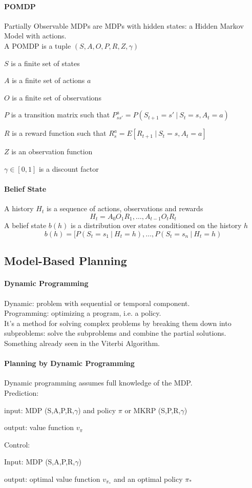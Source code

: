 \documentclass[10pt]{report}
\begin{document}
\paragraph{POMDP} Partially Observable MDPs are MDPs with hidden states: a Hidden Markov Model with actions.\\
A POMDP is a tuple $(S,A,O,P,R,Z,\gamma)$
\begin{list}{}{}
	\item $S$ is a finite set of states
	\item $A$ is a finite set of actions $a$
	\item $O$ is a finite set of observations
	\item $P$ is a transition matrix such that $P_{ss'}^a=P(S_{t+1}=s'\:|\:S_t=s,A_t=a)$
	\item $R$ is a reward function such that $R_s^a = E[R_{t+1}\:|\:S_t=s,A_t=a]$
	\item $Z$ is an observation function
	\item $\gamma\in[0,1]$ is a discount factor
\end{list}
\paragraph{Belief State} A history $H_t$ is a sequence of actions, observations and rewards $$H_t = A_0O_1R_1,\ldots,A_{t-1}O_tR_t$$
A belief state $b(h)$ is a distribution over states conditioned on the history $h$
$$b(h) = [P(S_t=s_1\:|\:H_t=h),\ldots,P(S_t=s_n\:|\:H_t=h)$$
\subsection{Model-Based Planning}
\paragraph{Dynamic Programming} Dynamic: problem with sequential or temporal component.\\
Programming: optimizing a program, i.e. a policy.\\
It's a method for solving complex problems by breaking them down into subproblems: solve the subproblems and combine the partial solutions.\\
Something already seen in the Viterbi Algorithm.
\paragraph{Planning by Dynamic Programming} Dynamic programming assumes full knowledge of the MDP.\\
Prediction:\begin{list}{}{}
	\item input: MDP (S,A,P,R,$\gamma$) and policy $\pi$ or MKRP (S,P,R,$\gamma$)
	\item output: value function $v_\pi$
\end{list}
Control:
\begin{list}{}{}
	\item Input: MDP (S,A,P,R,$\gamma$)
	\item output: optimal value function $v_{\pi_*}$ and an optimal policy $\pi_*$
\end{list}
\end{document}
